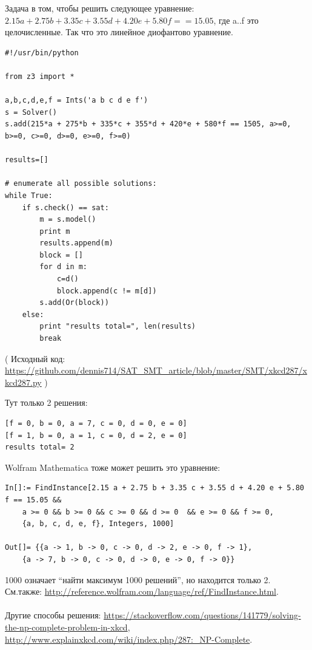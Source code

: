 Задача в том, чтобы решить следующее уравнение:
$2.15a + 2.75b + 3.35c + 3.55d + 4.20e + 5.80f == 15.05$,
где a..f это целочисленные.
Так что это линейное диофантово уравнение.

\begin{lstlisting}
#!/usr/bin/python

from z3 import *

a,b,c,d,e,f = Ints('a b c d e f')
s = Solver()
s.add(215*a + 275*b + 335*c + 355*d + 420*e + 580*f == 1505, a>=0, b>=0, c>=0, d>=0, e>=0, f>=0)

results=[]

# enumerate all possible solutions:
while True:
    if s.check() == sat:
        m = s.model()
        print m
        results.append(m)
        block = []
        for d in m:
            c=d()
            block.append(c != m[d])
        s.add(Or(block))
    else:
        print "results total=", len(results)
        break
\end{lstlisting}

( Исходный код: \url{https://github.com/dennis714/SAT_SMT_article/blob/master/SMT/xkcd287/xkcd287.py} )

Тут только 2 решения:

\begin{lstlisting}
[f = 0, b = 0, a = 7, c = 0, d = 0, e = 0]
[f = 1, b = 0, a = 1, c = 0, d = 2, e = 0]
results total= 2
\end{lstlisting}

Wolfram Mathematica тоже может решить это уравнение:

\begin{lstlisting}
In[]:= FindInstance[2.15 a + 2.75 b + 3.35 c + 3.55 d + 4.20 e + 5.80 f == 15.05 && 
	a >= 0 && b >= 0 && c >= 0 && d >= 0  && e >= 0 && f >= 0, 
	{a, b, c, d, e, f}, Integers, 1000]

Out[]= {{a -> 1, b -> 0, c -> 0, d -> 2, e -> 0, f -> 1},
	{a -> 7, b -> 0, c -> 0, d -> 0, e -> 0, f -> 0}}
\end{lstlisting}

1000 означает ``найти максимум 1000 решений'', но находится только 2.
См.также: \url{http://reference.wolfram.com/language/ref/FindInstance.html}.\\
\\
Другие способы решения:
\url{https://stackoverflow.com/questions/141779/solving-the-np-complete-problem-in-xkcd},
\url{http://www.explainxkcd.com/wiki/index.php/287:_NP-Complete}.

